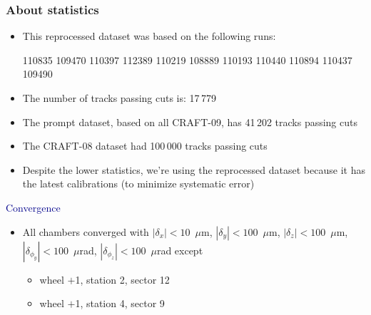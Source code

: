 \documentclass[compress]{beamer}
\begin{document}
\begin{frame}
\frametitle{About statistics}
\begin{itemize}
\item This reprocessed dataset was based on the following runs:

110835 109470 110397 112389 110219 108889 110193 110440 110894 110437 109490

\item The number of tracks passing cuts is: 17$\,$779

\item The prompt dataset, based on all CRAFT-09, has 41$\,$202 tracks passing cuts

\item The CRAFT-08 dataset had 100$\,$000 tracks passing cuts

\item Despite the lower statistics, we're using the reprocessed
  dataset because it has the latest calibrations (to minimize
  systematic error)
\end{itemize}

\vfill
\hspace{-0.83 cm} \textcolor{darkblue}{\Large Convergence}
\vspace{0.2 cm}
\begin{itemize}
\item All chambers converged with $|\delta_x| < 10$~$\mu$m,
  $|\delta_y| < 100$~$\mu$m, $|\delta_z| < 100$~$\mu$m,
  $|\delta_{\phi_y}| < 100$~$\mu$rad, $|\delta_{\phi_z}| <
  100$~$\mu$rad except
\begin{itemize}
\item wheel $+$1, station 2, sector 12
\item wheel $+$1, station 4, sector 9
\end{itemize}
\end{itemize}
\end{frame}
\end{document}
